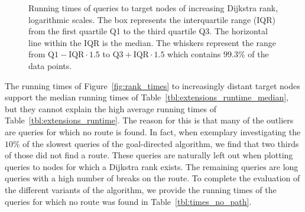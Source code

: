 \begin{figure}[hbtp]
	\hfill
	\caption[Running times of queries to target nodes of increasing Dijkstra rank, logarithmic scales.]{Running times of queries to target nodes of increasing Dijkstra rank, logarithmic scales. The box represents the interquartile range (IQR) from the first quartile Q1 to the third quartile Q3. The horizontal line within the IQR is the median. The whiskers represent the range from $\text{Q1} - \text{IQR} \cdot 1.5$ to $\text{Q3} + \text{IQR} \cdot 1.5$ which contains $99.3\%$ of the data points.}
	\label{fig:rank_times_2}
\end{figure}


The running times of Figure~\ref{fig:rank_times} to increasingly distant target nodes support the median running times of Table~\ref{tbl:extensions_runtime_median}, but they cannot explain the high average running times of Table~\ref{tbl:extensions_runtime}. The reason for this is that many of the outliers are queries for which no route is found. In fact, when exemplary investigating the $10\%$ of the slowest queries of the goal-directed algorithm, we find that two thirds of those did not find a route. These queries are naturally left out when plotting queries to nodes for which a Dijkstra rank exists. The remaining queries are long queries with a high number of breaks on the route. To complete the evaluation of the different variants of the algorithm, we provide the running times of the queries for which no route was found in Table~\ref{tbl:times_no_path}.

